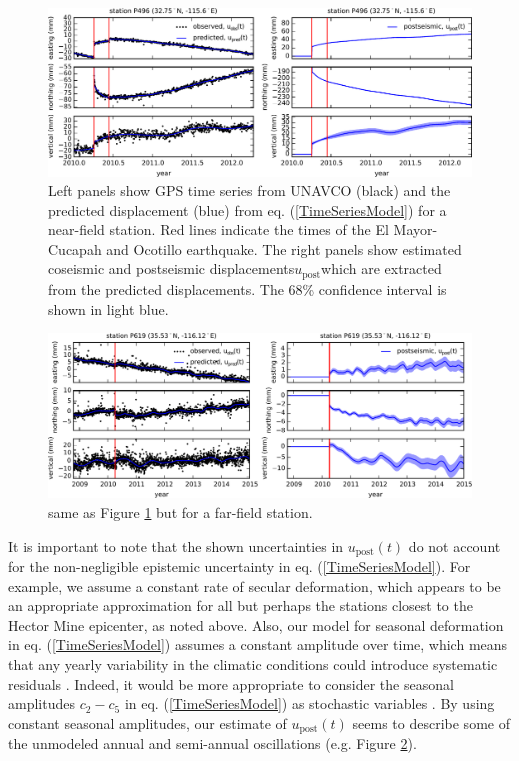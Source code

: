 \documentclass[draft,linenumbers]{AGUJournal}
\providecommand{\DIFadd}[1]{{\protect\color{blue}\uwave{#1}}} %
\providecommand{\DIFaddFL}[1]{\DIFadd{#1}} %
\providecommand{\DIFaddbeginFL}{} %
\providecommand{\DIFaddendFL}{} %
\providecommand{\DIFdelbeginFL}{} %
\providecommand{\DIFdelendFL}{} %
\begin{document}
\begin{figure}
\DIFdelbeginFL %
\DIFdelendFL \DIFaddbeginFL \includegraphics[scale=0.9]{Figures/2016jb013114-p02}
\DIFaddendFL \centering
\caption{Left panels show GPS time series from UNAVCO (black) and the predicted displacement (blue) from eq. (\ref{TimeSeriesModel}) for a near-field station.  Red lines indicate the times of the El Mayor-Cucapah and Ocotillo earthquake. The right panels show estimated coseismic and postseismic displacements\DIFaddbeginFL \DIFaddFL{, }\DIFaddendFL $u_\mathrm{post}$\DIFaddbeginFL \DIFaddFL{, }\DIFaddendFL which are extracted from the predicted displacements.  The 68\% confidence interval is shown in light blue.}
\label{fig:P496}
\end{figure}

\begin{figure}
\DIFdelbeginFL %
\DIFdelendFL \DIFaddbeginFL \noindent\includegraphics[scale=0.9]{Figures/2016jb013114-p03}
\DIFaddendFL \centering
\caption{same as Figure \ref{fig:P496} but for a far-field station.} 
\label{fig:P619}
\end{figure}

It is important to note that the shown uncertainties in $u_\mathrm{post}(t)$ do not account for the non-negligible epistemic uncertainty in eq. (\ref{TimeSeriesModel}).  For example, we assume a constant rate of secular deformation, which appears to be an appropriate approximation for all but perhaps the stations closest to the Hector Mine epicenter, as noted above.  Also, our model for seasonal deformation in eq. (\ref{TimeSeriesModel}) assumes a constant amplitude over time, which means that any yearly variability in the climatic conditions could introduce systematic residuals \citep{Davis2012}. Indeed, it would be more appropriate to consider the seasonal amplitudes $c_2-c_5$ in eq. (\ref{TimeSeriesModel}) as stochastic variables \citep{Murray2005}. By using constant seasonal amplitudes, our estimate of $u_\mathrm{post}(t)$ seems to describe some of the unmodeled annual and semi-annual oscillations (e.g. Figure \ref{fig:P619}).          
\end{document}
